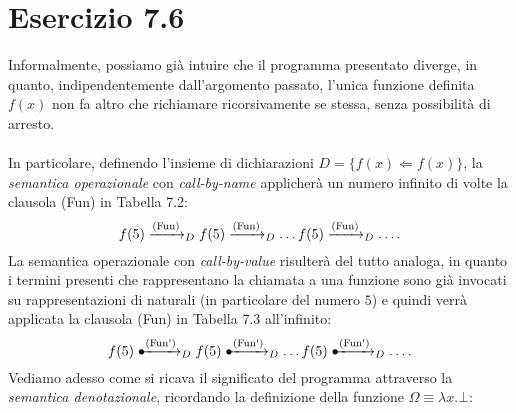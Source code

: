 \section*{Esercizio 7.6}

    
    Informalmente, possiamo già intuire che il programma presentato diverge, in quanto, indipendentemente dall'argomento passato, l'unica funzione definita $f(x)$ non fa altro che richiamare ricorsivamente se stessa, senza possibilità di arresto.\\
    \\
    In particolare, definendo l'insieme di dichiarazioni $D = \{f(x) \Leftarrow f(x)\}$, la \textit{semantica operazionale} con \textit{call-by-name} applicherà un numero infinito di volte la clausola (Fun) in Tabella 7.2:
    $$f(5) \xrightarrow{\mbox{\scriptsize(Fun)}}_D f(5) \xrightarrow{\mbox{\scriptsize(Fun)}}_D \dots f(5) \xrightarrow{\mbox{\scriptsize(Fun)}}_D \dots.$$
    La semantica operazionale con \textit{call-by-value} risulterà del tutto analoga, in quanto i termini presenti che rappresentano la chiamata a una funzione sono già invocati su rappresentazioni di naturali (in particolare del numero $5$) e quindi verrà applicata la clausola (Fun\textquotesingle) in Tabella 7.3 all'infinito:
    $$f(5) \dotxrightarrow{\mbox{\scriptsize(Fun\textquotesingle)}}_D f(5) \dotxrightarrow{\mbox{\scriptsize(Fun\textquotesingle)}}_D \dots f(5) \dotxrightarrow{\mbox{\scriptsize(Fun\textquotesingle)}}_D \dots.$$
    Vediamo adesso come si ricava il significato del programma attraverso la \textit{semantica denotazionale}, ricordando la definizione della funzione $\Omega \equiv \lambda x.\bot$:

